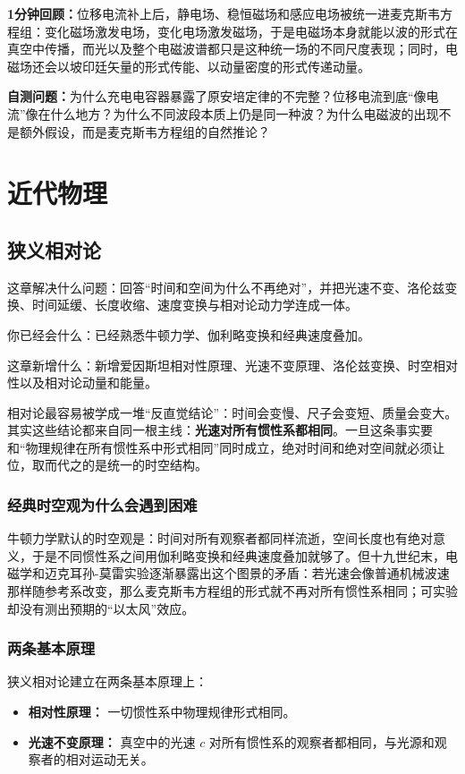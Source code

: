 \documentclass[lang=cn,11pt]{elegantbook}
\newcommand{\bridge}[1]{\begin{note}#1\end{note}}
\newcommand{\chapterroadmap}[3]{%
\begin{introduction}
  \item {\heiti 这章解决什么问题：}#1
  \item {\heiti 你已经会什么：}#2
  \item {\heiti 这章新增什么：}#3
\end{introduction}}
\newcommand{\summaryline}[1]{\par\noindent\textbf{1分钟回顾：}#1\par}
\newcommand{\chapterselfcheck}[1]{\par\noindent\textbf{自测问题：}#1\par}
\begin{document}
\summaryline{位移电流补上后，静电场、稳恒磁场和感应电场被统一进麦克斯韦方程组：变化磁场激发电场，变化电场激发磁场，于是电磁场本身就能以波的形式在真空中传播，而光以及整个电磁波谱都只是这种统一场的不同尺度表现；同时，电磁场还会以坡印廷矢量的形式传能、以动量密度的形式传递动量。}
\chapterselfcheck{为什么充电电容器暴露了原安培定律的不完整？位移电流到底“像电流”像在什么地方？为什么不同波段本质上仍是同一种波？为什么电磁波的出现不是额外假设，而是麦克斯韦方程组的自然推论？}

\part{近代物理}

\chapter{狭义相对论}

\chapterroadmap
{回答“时间和空间为什么不再绝对”，并把光速不变、洛伦兹变换、时间延缓、长度收缩、速度变换与相对论动力学连成一体。}
{已经熟悉牛顿力学、伽利略变换和经典速度叠加。}
{新增爱因斯坦相对性原理、光速不变原理、洛伦兹变换、时空相对性以及相对论动量和能量。}

\bridge{相对论最容易被学成一堆“反直觉结论”：时间会变慢、尺子会变短、质量会变大。其实这些结论都来自同一根主线：\textbf{光速对所有惯性系都相同}。一旦这条事实要和“物理规律在所有惯性系中形式相同”同时成立，绝对时间和绝对空间就必须让位，取而代之的是统一的时空结构。}

\section{经典时空观为什么会遇到困难}

牛顿力学默认的时空观是：时间对所有观察者都同样流逝，空间长度也有绝对意义，于是不同惯性系之间用伽利略变换和经典速度叠加就够了。但十九世纪末，电磁学和迈克耳孙-莫雷实验逐渐暴露出这个图景的矛盾：若光速会像普通机械波速那样随参考系改变，那么麦克斯韦方程组的形式就不再对所有惯性系相同；可实验却没有测出预期的“以太风”效应。

\section{两条基本原理}

狭义相对论建立在两条基本原理上：
\begin{itemize}
  \item \textbf{相对性原理：} 一切惯性系中物理规律形式相同。
  \item \textbf{光速不变原理：} 真空中的光速 \(c\) 对所有惯性系的观察者都相同，与光源和观察者的相对运动无关。
\end{itemize}
\end{document}
